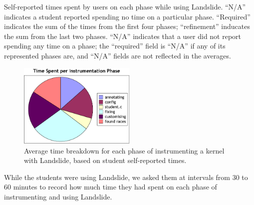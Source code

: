 {\begin{table}[t]
\begin{center}
	\end{center}
	\caption{Self-reported times spent by users on each phase while using Landslide. ``N/A'' indicates a student reported spending no time on a particular phase. ``Required'' indicates the sum of the times from the first four phases; ``refinement'' inducates the sum from the last two phases.
	``N/A'' indicates that a user did not report spending any time on a phase; the ``required'' field is ``N/A'' if any of its represented phases are, and ``N/A'' fields are not reflected in the averages.}
	\label{fig:student-times}
\end{table}
\begin{figure}[h]
	\center
	\includegraphics[width=0.5\textwidth]{graphs/studence-pie.pdf}
	\caption{Average time breakdown for each phase of instrumenting a kernel with Landslide, based on student self-reported times.}
	\label{fig:student-pie}
\end{figure}

While the students were using Landslide, we asked them at intervals from 30 to 60 minutes to record how much time they had spent on each phase of instrumenting and using Landslide.

}
